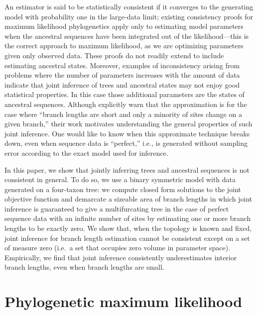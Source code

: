 \documentclass[11pt]{article}
\begin{document}
An estimator is said to be statistically consistent if it converges to the generating model with probability one in the large-data limit; existing consistency proofs for maximum likelihood phylogenetics \citep{Allman2008-wd,Chai2011-ff,RoyChoudhury2015-ta} apply only to estimating model parameters when the ancestral sequences have been integrated out of the likelihood---this is the correct approach to maximum likelihood, as we are optimizing parameters given only observed data.
These proofs do not readily extend to include estimating ancestral states.
Moreover, examples of inconsistency arising from problems where the number of parameters increases with the amount of data \citep{Neyman1948-tt} indicate that joint inference of trees and ancestral states may not enjoy good statistical properties.
In this case those additional parameters are the states of ancestral sequences.
Although \citet{Sagulenko2018-xl} explicitly warn that the approximation is for the case where ``branch lengths are short and only a minority of sites change on a given branch,'' their work motivates understanding the general properties of such joint inference.
One would like to know when this approximate technique breaks down, even when sequence data is ``perfect,'' i.e., is generated without sampling error according to the exact model used for inference.

In this paper, we show that jointly inferring trees and ancestral sequences is not consistent in general.
To do so, we use a binary symmetric model with data generated on a four-taxon tree: we compute closed form solutions to the joint objective function and demarcate a sizeable area of branch lengths in which joint inference is guaranteed to give a multifurcating tree in the case of perfect sequence data with an infinite number of sites by estimating one or more branch lengths to be exactly zero.
We show that, when the topology is known and fixed, joint inference for branch length estimation cannot be consistent except on a set of measure zero (i.e.\ a set that occupies zero volume in parameter space).
Empirically, we find that joint inference consistently underestimates interior branch lengths, even when branch lengths are small.

\section*{Phylogenetic maximum likelihood}
\end{document}

